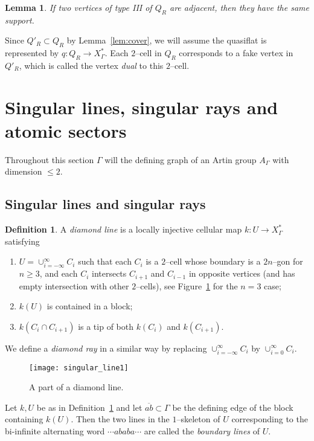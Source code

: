 \documentclass[11pt]{amsart}
\newtheorem{lemma}[theorem]{Lemma}
\theoremstyle{definition}
\newtheorem{definition}[theorem]{Definition}
\newcommand{\Xa}{X^{\ast}}
\begin{document}
\begin{lemma}
	\label{lem:same tag}
If two vertices of type III of $Q_R$ are adjacent, then they have the same support.
\end{lemma}



Since $Q'_R\subset Q_R$ by Lemma~\ref{lem:cover}, we will assume the quasiflat is represented by $q\colon Q_R\to \Xa_\Gamma$. Each $2$--cell in $Q_R$ corresponds to a fake vertex in $Q'_R$, which is called the vertex \emph{dual} to this $2$--cell.

\section{Singular lines, singular rays and atomic sectors}
\label{sec:singular lines}
Throughout this section $\Gamma$ will the defining graph of an Artin group $A_\Gamma$ with dimension $\le 2$.
\subsection{Singular lines and singular rays}
\label{subsec:singular lines}
\begin{definition}
	\label{def:diamond line}
A \emph{diamond line} is a locally injective cellular map $k\colon U\to \Xa_\Gamma$ satisfying
\begin{enumerate}
	\item $U=\cup_{i=-\infty}^{\infty} C_i$ such that each $C_i$ is a $2$--cell whose boundary is a $2n$--gon for $n\ge 3$, and each $C_i$ intersects $C_{i+1}$ and $C_{i-1}$ in opposite vertices (and has empty intersection with other $2$--cells), see Figure~\ref{f:singular_line1} for the $n=3$ case;
	\item $k(U)$ is contained in a block;
	\item $k(C_i\cap C_{i+1})$ is a tip of both $k(C_i)$ and $k(C_{i+1})$.
\end{enumerate}
We define a \emph{diamond ray} in a similar way by replacing $\cup_{i=-\infty}^{\infty} C_i$ by $\cup_{i=0}^{\infty} C_i$.
\end{definition}
\begin{figure}[h!]
	\centering
	\texttt{[image: singular\_line1]}
	\caption{A part of a diamond line.}
	\label{f:singular_line1}
\end{figure}

Let $k,U$ be as in Definition~\ref{def:diamond line} and let $\overline{ab}\subset\Gamma$ be the defining edge of the block containing $k(U)$. Then the two lines in the $1$--skeleton of $U$ corresponding to the bi-infinite alternating word $\cdots ababa\cdots$ are called the \emph{boundary lines} of $U$. 
\end{document}
